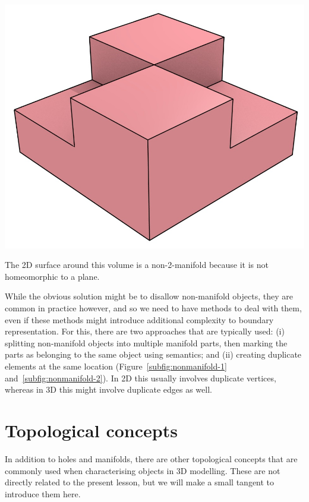 \begin{marginfigure}
\centering
\includegraphics[width=\linewidth]{figs/non2manifold.jpg}
\caption{The 2D surface around this volume is a non-2-manifold because it is not homeomorphic to a plane.}%
\label{fig:non2manifold}
\end{marginfigure}

While the obvious solution might be to disallow non-manifold objects, they are common in practice however, and so we need to have methods to deal with them, even if these methods might introduce additional complexity to boundary representation.
For this, there are two approaches that are typically used: (i) splitting non-manifold objects into multiple manifold parts, then marking the parts as belonging to the same object using semantics; and (ii) creating duplicate elements at the same location (Figure~\ref{subfig:nonmanifold-1} and~\ref{subfig:nonmanifold-2}).
In 2D this usually involves duplicate vertices, whereas in 3D this might involve duplicate edges as well.

\section{Topological concepts}

In addition to holes and manifolds, there are other topological concepts that are commonly used when characterising objects in 3D modelling.
These are not directly related to the present lesson, but we will make a small tangent to introduce them here.

